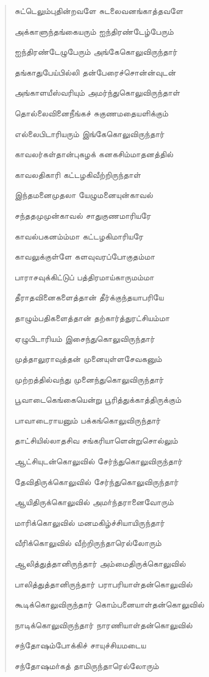 \documentclass{article}
\begin{document}
\begin{quotation}
{சுட்டெலும்புதின்றவளே சுடலைவனங்காத்தவளே

அக்காளுந்தங்கையரும் ஐந்திரண்டேழ்பேரும்

ஐந்திரண்டேழுபேரும் அங்கேகொலுவிருந்தார்

தங்காதுபேய்பில்லி தன்பேரைச்சொன்ன்வுடன்

அங்காளயீஸ்வரியும் அமர்ந்துகொலுவிருந்தாள்

தொல்லைவினைநீங்கச் சுகுணமதையளிக்கும்

எல்லைபிடாரியரும் இங்கேகொலுவிருந்தார்

காவலர்கள்தான்புகழக் கனகசிம்மாதனத்தில்

காவலதிகாரி கட்டழகிவீற்றிருந்தாள்

இந்தமனைமுதலா யேழுமனையுன்காவல்

சந்ததமுமுன்காவல் சாதுகுணமாரியரே

காவல்பகனம்ம்மா கட்டழகிமாரியரே

காவலுக்குள்ளே களவுவரப்போகுதம்மா

பாராசவுக்கிட்டுப் பத்திரமாய்காருமம்மா

தீராதவினைகளைத்தான் தீர்க்குந்தயாபரியே

தாழும்பதிகளைத்தான் தற்கார்த்துரட்சியம்மா

ஏழுபிடாரியம் இசைந்துகொலுவிருந்தார்

முத்தாலுராவுத்தன் முனையுள்ளசேவகனும்

முற்றத்தில்வந்து முனைந்துகொலுவிருந்தார்

பூவாடைகெங்கையென்று பூரித்துக்காத்திருக்கும்

பாவாடைராயனும் பக்கங்கொலுவிருந்தார்

தாட்சியில்லாதசிவ சங்கரியாளென்றுசொல்லும்

ஆட்சியுடன்கொலுவில் சேர்ந்துகொலுவிருந்தார்

தேவிதிருக்கொலுவில் சேர்ந்துகொலுவிருந்தார்

ஆயிதிருக்கொலுவில் அமா்ந்தரானைவோரும்

மாரிக்கொலுவில் மனமகிழ்ச்சியாயிருந்தார்

வீரிக்கொலுவில் வீற்றிருந்தாரெல்லோரும்

ஆலித்துத்தானிருந்தார் அம்மைதிருக்கொலுவில்

பாலித்துத்தானிருந்தார் பராபரியாள்தன்கொலுவில்

கூடிக்கொலுவிருந்தார் கொம்பனையாள்தன்கொலுவில்

நாடிக்கொலுவிருந்தார் நாரணியாள்தன்கொலுவில்

சந்தோஷம்போக்கிச் சாயுச்சியமடைய

சந்தோஷமா்கத் தாமிருந்தாரெல்லோரும்

}
\end{quotation}
\end{document}
